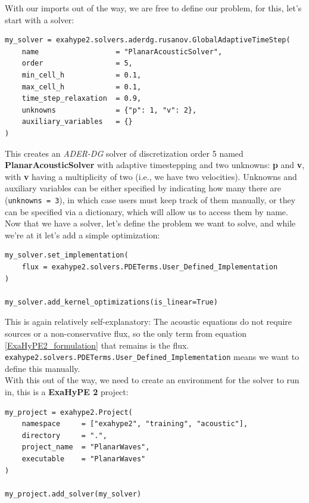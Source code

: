 \documentclass[12pt,letterpaper]{article}
\begin{document}
With our imports out of the way, we are free to define our problem, for this, let's start with a solver:\\

\begin{lstlisting}[style = Python]
my_solver = exahype2.solvers.aderdg.rusanov.GlobalAdaptiveTimeStep(
    name                  = "PlanarAcousticSolver",
    order                 = 5,
    min_cell_h            = 0.1,
    max_cell_h            = 0.1,
    time_step_relaxation  = 0.9,
    unknowns              = {"p": 1, "v": 2},
    auxiliary_variables   = {}
)
\end{lstlisting}

This creates an \textit{ADER-DG} solver of discretization order 5 named \textbf{PlanarAcousticSolver} with adaptive timestepping and two unknowns:
\textbf{p} and \textbf{v}, with \textbf{v} having a multiplicity of two (i.e., we have two velocities).
Unknowns and auxiliary variables can be either specified by indicating how many there are (\texttt{unknowns = 3}),
in which case users must keep track of them manually, or they can be specified via a dictionary, which will allow us to access them by name.\\

Now that we have a solver, let's define the problem we want to solve, and while we're at it let's add a simple optimization:\\

\begin{lstlisting}[style = Python]
my_solver.set_implementation(
    flux = exahype2.solvers.PDETerms.User_Defined_Implementation
)

my_solver.add_kernel_optimizations(is_linear=True)
\end{lstlisting}

This is again relatively self-explanatory: The acoustic equations do not require sources or a non-conservative flux,
so the only term from equation \ref{ExaHyPE2_formulation} that remains is the flux.
\texttt{exahype2.solvers.PDETerms.User\_Defined\_Implementation} means we want to define this manually.\\
With this out of the way, we need to create an environment for the solver to run in, this is a \textbf{ExaHyPE 2} project:\\

\begin{lstlisting}[style = Python]
my_project = exahype2.Project(
    namespace     = ["exahype2", "training", "acoustic"],
    directory     = ".",
    project_name  = "PlanarWaves",
    executable    = "PlanarWaves"
)

my_project.add_solver(my_solver)
\end{lstlisting}
\end{document}
